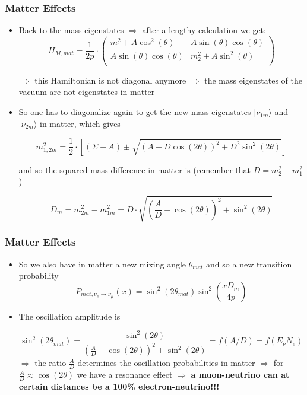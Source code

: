 \documentclass{beamer}
\begin{document}
\begin{frame}
  \frametitle{Matter Effects}

  \begin{itemize}
    \item Back to the mass eigenstates $\Rightarrow$ after a lengthy calculation we get:
$$
H_{M,mat}=
\frac{1}{2p} \cdot
\left(\begin{array}{cc}
m_1^2+A \cos^2(\theta) & A \sin(\theta) \cos(\theta)\\
A \sin(\theta) \cos(\theta) & m_2^2+A \sin^2(\theta)\\
\end{array}\right)
$$

$\Rightarrow$ this Hamiltonian is not diagonal anymore $\Rightarrow$ the mass eigenstates of the vacuum are not eigenstates in matter 

	\item So one has to diagonalize again to get the new mass eigenstates $|\nu_{1m}\rangle$ and $|\nu_{2m}\rangle$ in matter, which gives

$$m_{1,2m}^{2}=\frac{1}{2}\cdot \left[ (\Sigma + A) \pm \sqrt{(A-D \cos(2 \theta))^2+ D^2 \sin^2(2\theta)} \right]$$ 

and so the squared mass difference in matter is (remember that $D=m_2^2-m_1^2$)

$$D_{m}=m_{2m}^{2}-m_{1m}^{2}= D \cdot \sqrt{(\frac{A}{D}-\cos(2 \theta))^2+\sin^2(2 \theta)}$$


   \end{itemize}
\end{frame}




\begin{frame}
  \frametitle{Matter Effects}

  \begin{itemize}
    \item So we also have in matter a new mixing angle $\theta_{mat}$
and so a new transition probability
$$P_{mat, \nu_e \rightarrow \nu_{\mu}}(x)= \sin^2(2\theta_{mat}) \sin^2\left(\frac{x D_{m}}{4p}\right) $$

	\item The oscillation amplitude is

$$\sin^2(2\theta_{mat})=\frac{\sin^2(2 \theta)}{(\frac{A}{D}-\cos(2 \theta))^2+\sin^2(2 \theta)}=f(A/D)=f(E_{\nu}N_e)$$
$\Rightarrow$ the ratio $\frac{A}{D}$ determines the oscillation probabilities in matter $\Rightarrow$ for $\frac{A}{D}\approx\cos(2\theta)$ we have a resonance effect $\Rightarrow$ \textbf{a muon-neutrino can at certain distances be a 100\% electron-neutrino!!!} 

   \end{itemize}
\end{frame}
\end{document}
